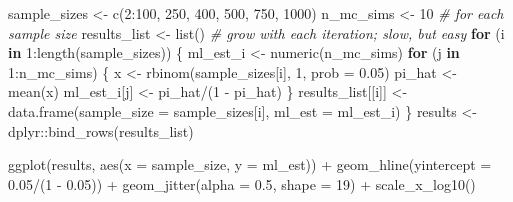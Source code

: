 \documentclass[
]{book}
\newenvironment{Shaded}{\begin{snugshade}}{\end{snugshade}}
\newcommand{\AttributeTok}[1]{\textcolor[rgb]{0.77,0.63,0.00}{#1}}
\newcommand{\CommentTok}[1]{\textcolor[rgb]{0.56,0.35,0.01}{\textit{#1}}}
\newcommand{\ControlFlowTok}[1]{\textcolor[rgb]{0.13,0.29,0.53}{\textbf{#1}}}
\newcommand{\DecValTok}[1]{\textcolor[rgb]{0.00,0.00,0.81}{#1}}
\newcommand{\FloatTok}[1]{\textcolor[rgb]{0.00,0.00,0.81}{#1}}
\newcommand{\FunctionTok}[1]{\textcolor[rgb]{0.00,0.00,0.00}{#1}}
\newcommand{\NormalTok}[1]{#1}
\newcommand{\OtherTok}[1]{\textcolor[rgb]{0.56,0.35,0.01}{#1}}
\newcommand{\SpecialCharTok}[1]{\textcolor[rgb]{0.00,0.00,0.00}{#1}}
\begin{document}
\begin{Shaded}
\begin{Highlighting}[]
\NormalTok{sample\_sizes }\OtherTok{\textless{}{-}} \FunctionTok{c}\NormalTok{(}\DecValTok{2}\SpecialCharTok{:}\DecValTok{100}\NormalTok{, }\DecValTok{250}\NormalTok{, }\DecValTok{400}\NormalTok{, }\DecValTok{500}\NormalTok{, }\DecValTok{750}\NormalTok{, }\DecValTok{1000}\NormalTok{)}
\NormalTok{n\_mc\_sims }\OtherTok{\textless{}{-}} \DecValTok{10}  \CommentTok{\# for each sample size}
\NormalTok{results\_list }\OtherTok{\textless{}{-}} \FunctionTok{list}\NormalTok{()  }\CommentTok{\# grow with each iteration; slow, but easy}
\ControlFlowTok{for}\NormalTok{ (i }\ControlFlowTok{in} \DecValTok{1}\SpecialCharTok{:}\FunctionTok{length}\NormalTok{(sample\_sizes)) \{}
\NormalTok{  ml\_est\_i }\OtherTok{\textless{}{-}} \FunctionTok{numeric}\NormalTok{(n\_mc\_sims)}
  \ControlFlowTok{for}\NormalTok{ (j }\ControlFlowTok{in} \DecValTok{1}\SpecialCharTok{:}\NormalTok{n\_mc\_sims) \{}
\NormalTok{    x }\OtherTok{\textless{}{-}} \FunctionTok{rbinom}\NormalTok{(sample\_sizes[i], }\DecValTok{1}\NormalTok{, }\AttributeTok{prob =} \FloatTok{0.05}\NormalTok{)}
\NormalTok{    pi\_hat }\OtherTok{\textless{}{-}} \FunctionTok{mean}\NormalTok{(x)}
\NormalTok{    ml\_est\_i[j] }\OtherTok{\textless{}{-}}\NormalTok{ pi\_hat}\SpecialCharTok{/}\NormalTok{(}\DecValTok{1} \SpecialCharTok{{-}}\NormalTok{ pi\_hat)}
\NormalTok{  \}}
\NormalTok{  results\_list[[i]] }\OtherTok{\textless{}{-}} \FunctionTok{data.frame}\NormalTok{(}\AttributeTok{sample\_size =}\NormalTok{ sample\_sizes[i],}
                             \AttributeTok{ml\_est =}\NormalTok{ ml\_est\_i)}
\NormalTok{\}}
\NormalTok{results }\OtherTok{\textless{}{-}}\NormalTok{ dplyr}\SpecialCharTok{::}\FunctionTok{bind\_rows}\NormalTok{(results\_list) }

\FunctionTok{ggplot}\NormalTok{(results, }\FunctionTok{aes}\NormalTok{(}\AttributeTok{x =}\NormalTok{ sample\_size, }\AttributeTok{y =}\NormalTok{ ml\_est)) }\SpecialCharTok{+} 
  \FunctionTok{geom\_hline}\NormalTok{(}\AttributeTok{yintercept =} \FloatTok{0.05}\SpecialCharTok{/}\NormalTok{(}\DecValTok{1} \SpecialCharTok{{-}} \FloatTok{0.05}\NormalTok{)) }\SpecialCharTok{+} 
  \FunctionTok{geom\_jitter}\NormalTok{(}\AttributeTok{alpha =} \FloatTok{0.5}\NormalTok{, }\AttributeTok{shape =} \DecValTok{19}\NormalTok{) }\SpecialCharTok{+} 
  \FunctionTok{scale\_x\_log10}\NormalTok{() }
\end{Highlighting}
\end{Shaded}
\end{document}
